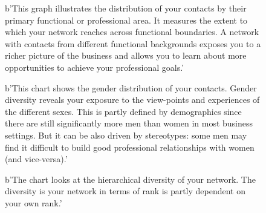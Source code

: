 \documentclass[a4paper,12pt]{article}
\begin{document}
\begin{figure}[H]
\centering
{}
\hspace{.01in}
\caption{b'This graph illustrates the distribution of your contacts by their primary functional or professional area. It measures the extent to which your network reaches across functional boundaries. A network with contacts from different functional backgrounds exposes you to a richer picture of the business and allows you to learn about more opportunities to achieve your professional goals.'}
\end{figure}


\begin{figure}[H]
\centering
{}
\hspace{.01in}
\caption{b'This chart shows the gender distribution of your contacts. Gender diversity reveals your exposure to the view-points and experiences of the different sexes. This is partly defined by demographics since there are still significantly more men than women in most business settings. But it can be also driven by stereotypes: some men may find it difficult to build good professional relationships with women (and vice-versa).'}
\end{figure}


\begin{figure}[H]
\centering
{}
\hspace{.01in}
\caption{b'The chart looks at the hierarchical diversity of your network. The diversity is your network in terms of rank is partly dependent on your own rank.'}
\end{figure}
\end{document}
